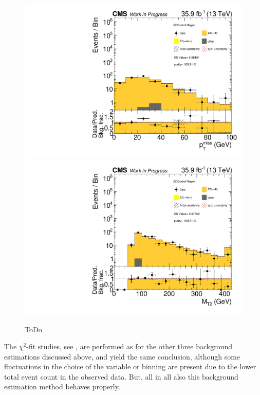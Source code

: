 \begin{figure}[tbp]
 \centering
 \includegraphics[width=\pairwidth]{figures/plots_CR_zz/CRZZ_LL_nom_met_log}
 \includegraphics[width=\pairwidth]{figures/plots_CR_zz/CRZZ_LL_nom_mt2_log}
 \caption{ToDo}
 \label{fig:CRZZ}
\end{figure}
The $\chi^2$-fit studies, see , are performed as for the other three background estimations discussed above, and yield the same conclusion, although some fluctuations in the choice of the variable or binning are present due to the lower total event count in the observed data. But, all in all also this background estimation method behaves properly.

